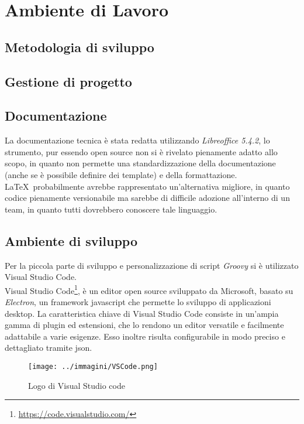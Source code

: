 \section{Ambiente di Lavoro}

\subsection{Metodologia di sviluppo}

\subsection{Gestione di progetto}

\subsection{Documentazione}
La documentazione tecnica è stata redatta utilizzando \textit{Libreoffice 5.4.2}, lo strumento, pur essendo open source non si è rivelato pienamente adatto allo scopo, in quanto non permette una standardizzazione della documentazione (anche se è possibile definire dei template) e della formattazione. \LaTeX\ probabilmente avrebbe rappresentato un'alternativa migliore, in quanto codice pienamente versionabile ma sarebbe di difficile adozione all'interno di un team, in quanto tutti dovrebbero conoscere tale linguaggio. 

\subsection{Ambiente di sviluppo}
Per la piccola parte di sviluppo e personalizzazione di script \textit{Groovy} si è utilizzato Visual Studio Code. \\
Visual Studio Code\footnote{\url{https://code.visualstudio.com/}}, è un editor open source sviluppato da Microsoft, basato su \textit{Electron}, un framework javascript che permette lo sviluppo di applicazioni desktop.
La caratteristica chiave di Visual Studio Code consiste in un'ampia gamma di \gls{plugin} ed estensioni, che lo rendono un editor versatile e facilmente adattabile a varie esigenze. Esso inoltre risulta configurabile in modo preciso e dettagliato tramite \gls{json}. 

\begin{figure}[H]
    \capstart
    \centering
    \texttt{[image: ../immagini/VSCode.png]}
    \caption{Logo di Visual Studio code}
\end{figure}

